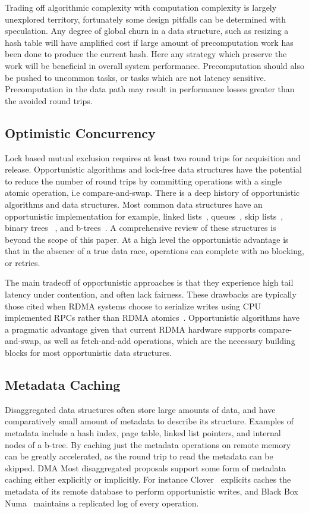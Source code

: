 Trading off algorithmic complexity with computation complexity is largely
unexplored territory, fortunately some design pitfalls can be determined with
speculation. Any degree of global churn in a data structure, such as resizing a
hash table will have amplified cost if large amount of precomputation work has
been done to produce the current hash. Here any strategy which preserve the work
will be beneficial in overall system performance. Precomputation should also be
pushed to uncommon tasks, or tasks which are not latency sensitive.
Precomputation in the data path may result in performance losses greater than
the avoided round trips.

\subsection{Optimistic Concurrency} 

Lock based mutual exclusion requires at least two round trips for acquisition
and release. Opportunistic algorithms and lock-free data structures have the
potential to reduce the number of round trips by committing operations with a
single atomic operation, i.e compare-and-swap. There is a deep history of
opportunistic algorithms and data structures. Most common data structures have
an opportunistic implementation for example, linked
lists~\cite{linked-list-cas}, queues~\cite{simple-fast}, skip
lists~\cite{lock-free-skip}, binary trees ~\cite{non-block-binary}, and
b-trees~\cite{read-concur-btree,lock-free-btree}. A comprehensive review of
these structures is beyond the scope of this paper. At a high level the
opportunistic advantage is that in the absence of a true data race, operations
can complete with no blocking, or retries.

The main tradeoff of opportunistic approaches is that they experience high tail
latency under contention, and often lack fairness. These drawbacks are typically
those cited when RDMA systems choose to serialize writes using CPU implemented
RPCs rather than RDMA atomics~\cite{pilaf, cell, herd}. Opportunistic algorithms
have a pragmatic advantage given that current RDMA hardware supports
compare-and-swap, as well as fetch-and-add operations, which are the necessary
building blocks for most opportunistic data structures.

\subsection{Metadata Caching}
Disaggregated data structures often store large amounts of data, and have
comparatively small amount of metadata to describe its structure. Examples of
metadata include a hash index, page table, linked list pointers, and internal
nodes of a b-tree. By caching just the metadata operations on remote memory can
be greatly accelerated, as the round trip to read the metadata can be skipped.
DMA 
Most disaggregated proposals support some form of metadata caching either
explicitly or implicitly. For instance Clover~\cite{clover} explicits caches the
metadata of its remote database to perform opportunistic writes, and Black Box
Numa~\cite{black-box-numa} maintains a replicated log of every operation. 

